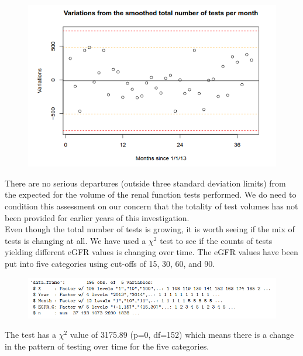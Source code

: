 \documentclass[11pt]{article}
\begin{document}
\begin{figure}[htp]
\centering
\includegraphics[scale=0.50]{fig4.png}
\caption{}
\label{}
\end{figure}

There are no serious departures (outside three standard deviation limits) from the expected for the volume of the renal function tests performed. We do need to condition this assessment on our concern that the totality of test volumes has not been provided for earlier years of this investigation. \\

Even though the total number of tests is growing, it is worth seeing if the mix of tests is changing at all. We have used a $\chi^2$ test to see if the counts of tests yielding different eGFR values is changing over time. The eGFR values have been put into five categories using cut-offs of 15, 30, 60, and 90.\\

\begin{figure}[htp]
\centering
\includegraphics[scale=0.50]{fig5.png}
\caption{}
\label{}
\end{figure}

The test has a $\chi^2$ value of 3175.89 (p=0, df=152) which means there is a change in the pattern of testing over time for the five categories.\\
\end{document}
